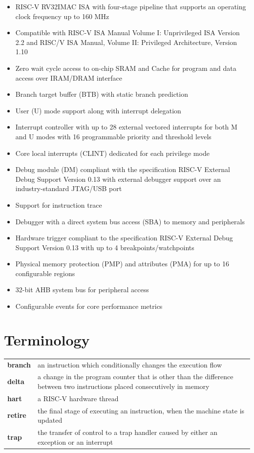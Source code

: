 \documentclass[main\_\_EN.tex]{subfiles}
\begin{document}
\begin{itemize}
    \item RISC-V RV32IMAC ISA with four-stage pipeline that supports an operating clock frequency up to 160 MHz
    \item Compatible with RISC-V ISA Manual Volume I: Unprivileged ISA Version 2.2 and RISC\-/V ISA Manual, Volume II: Privileged Architecture, Version 1.10
    \item Zero wait cycle access to on-chip SRAM and Cache for program and data access over IRAM/DRAM interface
    \item Branch target buffer (BTB) with static branch prediction
    \item User (U) mode support along with interrupt delegation
    \item Interrupt controller with up to 28 external vectored interrupts for both M and U modes with 16 programmable priority and threshold levels
    \item Core local interrupts (CLINT) dedicated for each privilege mode
    \item Debug module (DM) compliant with the specification RISC-V External Debug Support Version 0.13 with external debugger support over an industry-standard JTAG/USB port
    \item Support for instruction trace
    \item Debugger with a direct system bus access (SBA) to memory and peripherals
    \item Hardware trigger compliant to the specification RISC-V External Debug Support Version 0.13 with up to 4 breakpoints/watchpoints
    \item Physical memory protection (PMP) and attributes (PMA) for up to 16 configurable regions
    \item 32-bit AHB system bus for peripheral access
    \item Configurable events for core performance metrics
\end{itemize}

\section{Terminology}

\begin{longtable}[c]{ R{2cm} p{12cm} }
\textbf{branch} & an instruction which conditionally changes the execution flow \\
\textbf{delta} & a change in the program counter that is other than the difference between two instructions placed consecutively in memory \\
\textbf{hart} &  a RISC-V hardware thread \\
\textbf{retire} & the final stage of executing an instruction, when the machine state is updated \\
\textbf{trap} & the transfer of control to a trap handler caused by either an exception or an interrupt \\
\end{longtable}
\end{document}
